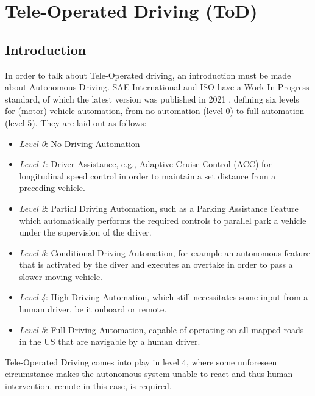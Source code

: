 \chapter{Tele-Operated Driving (ToD)}
\label{chap:tele_operated_driving}

\section{Introduction}
In order to talk about Tele-Operated driving, an introduction must be made about Autonomous Driving. SAE International and ISO have a Work In Progress standard, of which the latest version was published in 2021 \cite{iso_sae_levels}, defining six levels for (motor) vehicle automation, from no automation (level 0) to full automation (level 5). They are laid out as follows:

\begin{itemize}
    \item \textit{Level 0}: No Driving Automation
    \item \textit{Level 1}: Driver Assistance, e.g., Adaptive Cruise Control (ACC) for longitudinal speed control in order to maintain a set distance from a preceding vehicle.
    \item \textit{Level 2}: Partial Driving Automation, such as a Parking Assistance Feature which automatically performs the required controls to parallel park a vehicle under the supervision of the driver.
    \item \textit{Level 3}: Conditional Driving Automation, for example an autonomous feature that is activated by the diver and executes an overtake in order to pass a slower-moving vehicle.
    \item \textit{Level 4}: High Driving Automation, which still necessitates some input from a human driver, be it onboard or remote.
    \item \textit{Level 5}: Full Driving Automation, capable of operating on all mapped roads in the US that are navigable by a human driver.
\end{itemize}

Tele-Operated Driving comes into play in level 4, where some unforeseen circumstance makes the autonomous system unable to react and thus human intervention, remote in this case, is required.

